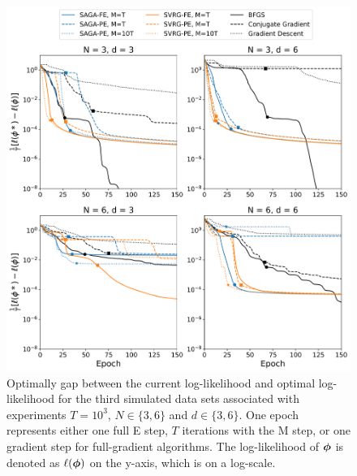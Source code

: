\documentclass[12pt]{article}
\begin{document}
\begin{figure}[H]
    \centering
    \includegraphics[width=6.5in]{../plt/log-like_v_epoch_T-1000-002.png}
    \caption{Optimally gap between the current log-likelihood and optimal log-likelihood for the third simulated data sets associated with experiments $T=10^{3}$, $N \in \{3,6\}$ and $d \in \{3,6\}$. One epoch represents either one full E step, $T$ iterations with the M step, or one gradient step for full-gradient algorithms. The log-likelihood of $\boldsymbol{\phi}$ is denoted as $\ell(\boldsymbol{\phi})$ on the y-axis, which is on a log-scale.}
\end{figure}
%
\end{document}
